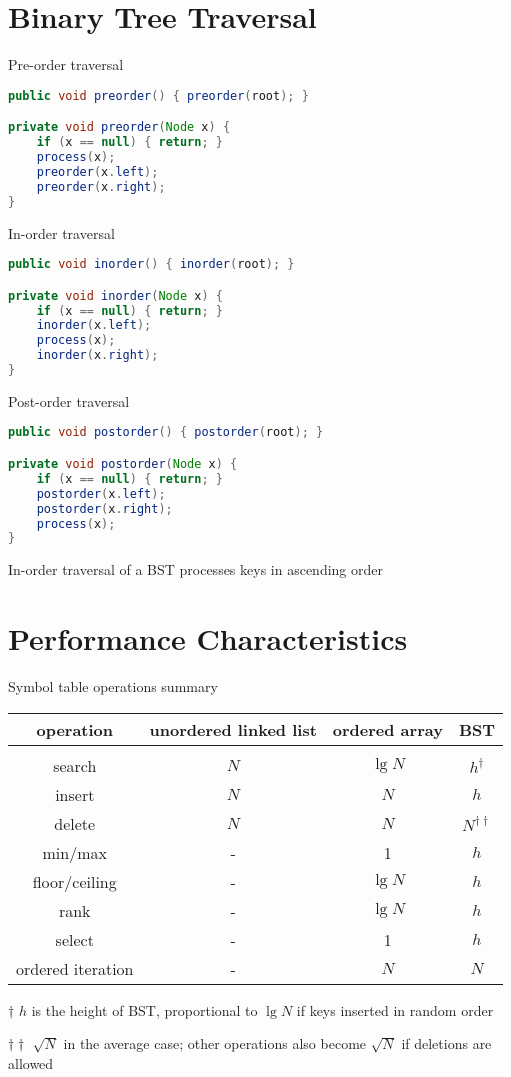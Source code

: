 \documentclass[8pt,a4paper,compress]{beamer}
\begin{document}
\section{Binary Tree Traversal}
\begin{frame}[fragile]
Pre-order traversal
\begin{lstlisting}[language=Java]
public void preorder() { preorder(root); }

private void preorder(Node x) {
    if (x == null) { return; }
    process(x);
    preorder(x.left);
    preorder(x.right);
}
\end{lstlisting}

\bigskip

In-order traversal
\begin{lstlisting}[language=Java]
public void inorder() { inorder(root); }

private void inorder(Node x) {
    if (x == null) { return; }
    inorder(x.left);
    process(x);
    inorder(x.right);
}
\end{lstlisting}

\bigskip

Post-order traversal
\begin{lstlisting}[language=Java]
public void postorder() { postorder(root); }

private void postorder(Node x) {
    if (x == null) { return; }
    postorder(x.left);
    postorder(x.right);
    process(x);
}
\end{lstlisting}

\bigskip

In-order traversal of a BST processes keys in ascending order
\end{frame}

\section{Performance Characteristics}
\begin{frame}[fragile]
Symbol table operations summary
\begin{center}
\begin{tabular}{cccc}
operation & unordered linked list & ordered array & BST \\ \hline \\
search & $N$ & $\lg N$ & $h^\dagger$ \\
insert & $N$ & $N$ & $h$ \\
delete & $N$ & $N$ & $N^{\dagger\dagger}$ \\
min/max & - & 1 & $h$ \\
floor/ceiling & - & $\lg N$ & $h$\\
rank & - & $\lg N$ & $h$ \\
select & - & 1 & $h$ \\
ordered iteration & - & $N$ & $N$ 
\end{tabular} 

\bigskip

\tiny $\dagger$ $h$ is the height of BST, proportional to $\lg N$ if keys inserted in random order

$\dagger\dagger$ $\sqrt{N}$ in the average case; other operations also become $\sqrt{N}$ if deletions are allowed
\end{center}
\end{frame}
\end{document}
